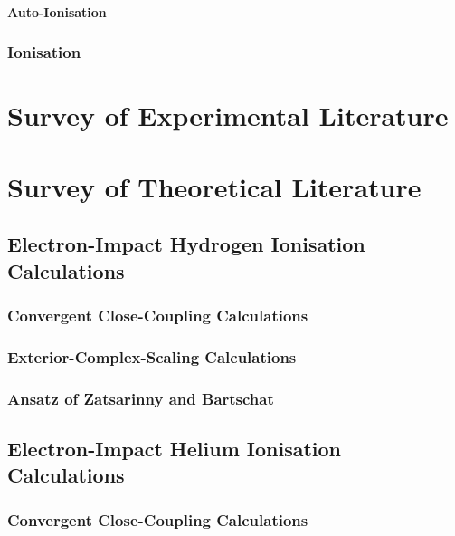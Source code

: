 \documentclass[draft]{article}
\begin{document}
\paragraph{Auto-Ionisation}
\label{sec:e-he-auto-ionisation}

\subsubsection{Ionisation}
\label{sec:e-he-ionisation}

\section{Survey of Experimental Literature}
\label{sec:survey-experimental}

\section{Survey of Theoretical Literature}
\label{sec:survey-theoretical}

\subsection{Electron-Impact Hydrogen Ionisation Calculations}
\label{sec:e-h-ionisation-calculations}

\subsubsection{Convergent Close-Coupling Calculations}
\label{sec:e-h-ccc-calculations}

\subsubsection{Exterior-Complex-Scaling Calculations}
\label{sec:e-h-ecs-calculations}

\subsubsection{Ansatz of Zatsarinny and Bartschat}
\label{sec:e-h-ecs-calculations}

\subsection{Electron-Impact Helium Ionisation Calculations}
\label{sec:e-he-ionisation-calculations}

\subsubsection{Convergent Close-Coupling Calculations}
\label{sec:e-he-ccc-calculations}
\end{document}
